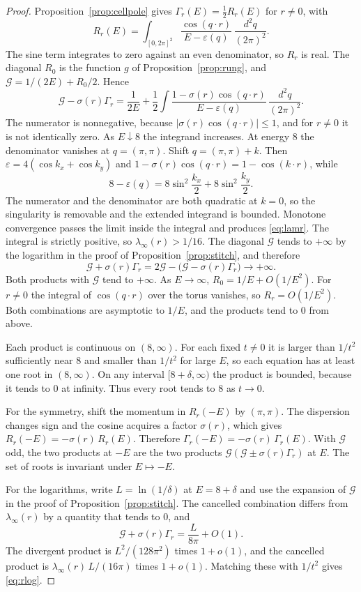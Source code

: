 \begin{proof}
Proposition~\ref{prop:cellpole} gives
\(\Gamma_r(E)=\tfrac12 R_r(E)\) for \(r\neq 0\), with
\[
R_r(E)
=\int_{[0,2\pi]^2}
\frac{\cos(q\cdot r)}{E-\varepsilon(q)}
\,\frac{d^2q}{(2\pi)^2}.
\]
The sine term integrates to zero against an even denominator, so
\(R_r\) is real.
The diagonal \(R_0\) is the function \(g\) of Proposition~\ref{prop:rung},
and \(\mathcal{G}=1/(2E)+R_0/2\).
Hence
\[
\mathcal{G}-\sigma(r)\Gamma_r
=\frac{1}{2E}
+\frac12\int
\frac{1-\sigma(r)\cos(q\cdot r)}{E-\varepsilon(q)}
\,\frac{d^2q}{(2\pi)^2}.
\]
The numerator is nonnegative, because
\(|\sigma(r)\cos(q\cdot r)|\le 1\), and for \(r\neq 0\) it is not
identically zero.
As \(E\downarrow 8\) the integrand increases.
At energy \(8\) the denominator vanishes at \(q=(\pi,\pi)\).
Shift \(q=(\pi,\pi)+k\).
Then \(\varepsilon=4(\cos k_x+\cos k_y)\) and
\(1-\sigma(r)\cos(q\cdot r)=1-\cos(k\cdot r)\),
while
\[
8-\varepsilon(q)
=8\sin^2\frac{k_x}{2}+8\sin^2\frac{k_y}{2}.
\]
The numerator and the denominator are both quadratic at \(k=0\), so the
singularity is removable and the extended integrand is bounded.
Monotone convergence passes the limit inside the integral and produces
\eqref{eq:lamr}.
The integral is strictly positive, so \(\lambda_\infty(r)>1/16\).
The diagonal \(\mathcal{G}\) tends to \(+\infty\) by the logarithm in the
proof of Proposition~\ref{prop:stitch}, and therefore
\[
\mathcal{G}+\sigma(r)\Gamma_r
=2\mathcal{G}-\bigl(\mathcal{G}-\sigma(r)\Gamma_r\bigr)
\to+\infty.
\]
Both products with \(\mathcal{G}\) tend to \(+\infty\).
As \(E\to\infty\), \(R_0=1/E+O(1/E^2)\).
For \(r\neq 0\) the integral of \(\cos(q\cdot r)\) over the torus vanishes, so
\(R_r=O(1/E^2)\).
Both combinations are asymptotic to \(1/E\), and the products tend to \(0\)
from above.

Each product is continuous on \((8,\infty)\).
For each fixed \(t\neq 0\) it is larger than \(1/t^2\) sufficiently near
\(8\) and smaller than \(1/t^2\) for large \(E\), so each equation has at
least one root in \((8,\infty)\).
On any interval \([8+\delta,\infty)\) the product is bounded, because it
tends to \(0\) at infinity.
Thus every root tends to \(8\) as \(t\to 0\).

For the symmetry, shift the momentum in \(R_r(-E)\) by \((\pi,\pi)\).
The dispersion changes sign and the cosine acquires a factor
\(\sigma(r)\), which gives
\(R_r(-E)=-\sigma(r)\,R_r(E)\).
Therefore \(\Gamma_r(-E)=-\sigma(r)\,\Gamma_r(E)\).
With \(\mathcal{G}\) odd, the two products at \(-E\) are the two products
\(\mathcal{G}(\mathcal{G}\pm\sigma(r)\Gamma_r)\) at \(E\).
The set of roots is invariant under \(E\mapsto -E\).

For the logarithms, write \(L=\ln(1/\delta)\) at \(E=8+\delta\) and use the
expansion of \(\mathcal{G}\) in the proof of Proposition~\ref{prop:stitch}.
The cancelled combination differs from \(\lambda_\infty(r)\) by a quantity
that tends to \(0\), and
\[
\mathcal{G}+\sigma(r)\Gamma_r
=\frac{L}{8\pi}+O(1).
\]
The divergent product is \(L^2/(128\pi^2)\) times \(1+o(1)\), and the
cancelled product is \(\lambda_\infty(r)\,L/(16\pi)\) times \(1+o(1)\).
Matching these with \(1/t^2\) gives \eqref{eq:rlog}.
\end{proof}

